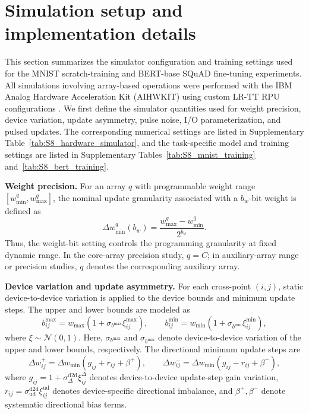 \documentclass[fleqn,10pt]{wlscirep}
\newcommand{\SIEndSection}{\FloatBarrier\clearpage}
\begin{document}
\SIEndSection

\clearpage
\section{Simulation setup and implementation details}
\label{sec:S8}

\noindent
This section summarizes the simulator configuration and training settings used for the MNIST scratch-training and BERT-base SQuAD fine-tuning experiments. All simulations involving array-based operations were performed with the IBM Analog Hardware Acceleration Kit (AIHWKIT) using custom LR-TT RPU configurations \cite{rasch2021aihwkit,legallo2023aihwkit}. We first define the simulator quantities used for weight precision, device variation, update asymmetry, pulse noise, I/O parameterization, and pulsed updates. The corresponding numerical settings are listed in Supplementary Table~\ref{tab:S8_hardware_simulator}, and the task-specific model and training settings are listed in Supplementary Tables~\ref{tab:S8_mnist_training} and~\ref{tab:S8_bert_training}.

\noindent\textbf{Weight precision.}
For an array \(q\) with programmable weight range \([w_{\min}^{q},w_{\max}^{q}]\), the nominal update granularity associated with a \(b_w\)-bit weight is defined as
\begin{equation}
\Delta w_{\min}^{q}(b_w)
=
\frac{w_{\max}^{q}-w_{\min}^{q}}{2^{b_w}} .
\label{eq:S8_weight_bit}
\end{equation}
Thus, the weight-bit setting controls the programming granularity at fixed dynamic range. In the core-array precision study, \(q=C\); in auxiliary-array range or precision studies, \(q\) denotes the corresponding auxiliary array.

\noindent\textbf{Device variation and update asymmetry.}
For each cross-point \((i,j)\), static device-to-device variation is applied to the device bounds and minimum update steps. The upper and lower bounds are modeled as
\begin{equation}
b^{\max}_{ij}=w_{\max}\left(1+\sigma_{b^{\max}}\xi_{ij}^{\max}\right),
\qquad
b^{\min}_{ij}=w_{\min}\left(1+\sigma_{b^{\min}}\xi_{ij}^{\min}\right),
\label{eq:S8_bound_dtod}
\end{equation}
where \(\xi\sim\mathcal{N}(0,1)\). Here, \(\sigma_{b^{\max}}\) and \(\sigma_{b^{\min}}\) denote device-to-device variation of the upper and lower bounds, respectively. The directional minimum update steps are
\begin{equation}
\Delta w^{+}_{ij}
=
\Delta w_{\min}
\left(g_{ij}+r_{ij}+\beta^{+}\right),
\qquad
\Delta w^{-}_{ij}
=
\Delta w_{\min}
\left(g_{ij}-r_{ij}+\beta^{-}\right),
\label{eq:S8_directional_step}
\end{equation}
where \(g_{ij}=1+\sigma_{\Delta}^{\mathrm{d2d}}\xi_{ij}^{\Delta}\) denotes device-to-device update-step gain variation, \(r_{ij}=\sigma_{\mathrm{ud}}^{\mathrm{d2d}}\xi_{ij}^{\mathrm{ud}}\) denotes device-specific directional imbalance, and \(\beta^{+},\beta^{-}\) denote systematic directional bias terms.
\end{document}
